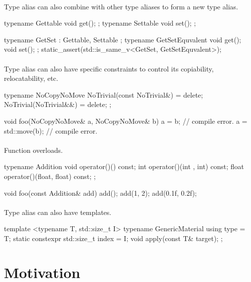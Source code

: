 \documentclass{article}
\begin{document}
\paragraph{}
Type alias can also combine with other type aliases to form a new type alias.
\begin{codeblock}
typename Gettable{ void get(); };
typename Settable{ void set(); };

typename GetSet : Gettable, Settable {};
typename GetSetEquvalent {
  void get();
  void set();
};
static_assert(std::is_same_v<GetSet, GetSetEquvalent>);
\end{codeblock}

\paragraph{}
Type alias can also have specific constraints to control its copiability, relocatability, etc.
\begin{codeblock}
typename NoCopyNoMove {
  NoTrivial(const NoTrivial&) = delete;
  NoTrivial(NoTrivial&&) = delete;
};

void foo(NoCopyNoMove& a, NoCopyNoMove& b) {
  a = b; // compile error.
  a = std::move(b); // compile error.
}
\end{codeblock}

\paragraph{}
Function overloads.

\begin{codeblock}
typename Addition {
  void operator()() const;
  int operator()(int , int) const;
  float operator()(float, float) const;
};

void foo(const Addition& add) {
  add();
  add(1, 2);
  add(0.1f, 0.2f);
}
\end{codeblock}

\paragraph{}
Type alias can also have templates.
\begin{codeblock}
template <typename T, std::size_t I>
typename GenericMaterial {
  using type = T;
  static constexpr std::size_t index = I;
  void apply(const T& target);
};
\end{codeblock}

\section{Motivation}
\end{document}
